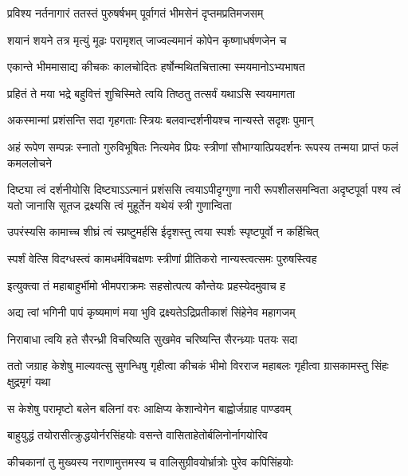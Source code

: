 \twolineshloka
{प्रविश्य नर्तनागारं ततस्तं पुरुषर्षभम्}
{पूर्वागतं भीमसेनं दृप्तमप्रतिमजसम्}


\twolineshloka
{शयानं शयने तत्र मृत्युं मूढः परामृशत्}
{जाज्वल्यमानं कोपेन कृष्णाधर्षणजेन च}


\twolineshloka
{एकान्ते भीममासाद्य कीचकः कालचोदितः}
{हर्षोन्मथितचित्तात्मा स्मयमानोऽभ्यभाषत}


\twolineshloka
{प्रहितं ते मया भद्रे बहुवित्तं शुचिस्मिते}
{त्वयि तिष्ठतु तत्सर्वं यथाऽसि स्वयमागता}


\twolineshloka
{अकस्मान्मां प्रशंसन्ति सदा गृहगताः स्त्रियः}
{बलवान्दर्शनीयश्च नान्यस्ते सदृशः पुमान्}


\threelineshloka
{अहं रूपेण सम्पन्नः स्नातो गुरुविभूषितः}
{नित्यमेव प्रियः स्त्रीणां सौभाग्यात्प्रियदर्शनः}
{रूपस्य तन्मया प्राप्तं फलं कमललोचने}




\onelineshloka
{दिष्ट्या त्वं दर्शनीयोसि दिष्ट्याऽऽत्मानं प्रशंससि}
\threelineshloka
{त्वयाऽपीदृग्गुणा नारी रूपशीलसमन्विता}
{अदृष्टपूर्वा पश्य त्वं यतो जानासि सूतज}
{द्रक्ष्यसि त्वं मुहूर्तेन यथेयं स्त्री गुणान्विता}


\twolineshloka
{उपरंस्यसि कामाच्च शीघ्रं त्वं स्प्रष्टुमर्हसि}
{ईदृशस्तु त्वया स्पर्शः स्पृष्टपूर्वो न कर्हिचित्}


\twolineshloka
{स्पर्शं वेत्सि विदग्धस्त्वं कामधर्मविचक्षणः}
{स्त्रीणां प्रीतिकरो नान्यस्त्वत्समः पुरुषस्त्विह}



\twolineshloka
{इत्युक्त्वा तं महाबाहुर्भीमो भीमपराक्रमः}
{सहसोत्पत्य कौन्तेयः प्रहस्येदमुवाच ह}


\twolineshloka
{अद्य त्वां भगिनी पापं कृष्यमाणं मया भुवि}
{द्रक्ष्यतेऽद्रिप्रतीकाशं सिंहेनेव महागजम्}


\twolineshloka
{निराबाधा त्वयि हते सैरन्ध्री विचरिष्यति}
{सुखमेव चरिष्यन्ति सैरन्ध्र्याः पतयः सदा}


\onelineshloka
{ततो जग्राह केशेषु माल्यवत्सु सुगन्धिषु}
\twolineshloka
{गृहीत्वा कीचकं भीमो विरराज महाबलः}
{गृहीत्वा ग्रासकामस्तु सिंहः क्षुद्रमृगं यथा}


\twolineshloka
{स केशेषु परामृष्टो बलेन बलिनां वरः}
{आक्षिप्य केशान्वेगेन बाह्वोर्जग्राह पाण्डवम्}


\twolineshloka
{बाहुयुद्धं तयोरासीत्क्रुद्धयोर्नरसिंहयोः}
{वसन्ते वासिताहेतोर्बलिनोर्नागयोरिव}


\twolineshloka
{कीचकानां तु मुख्यस्य नराणामुत्तमस्य च}
{वालिसुग्रीवयोर्भ्रात्रोः पुरेव कपिसिंहयोः}


